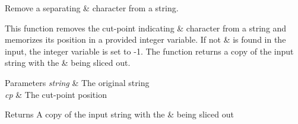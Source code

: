 Remove a separating \textquotesingle{}\&\textquotesingle{} character from a string. 

This function removes the cut-\/point indicating \textquotesingle{}\&\textquotesingle{} character from a string and memorizes its position in a provided integer variable. If not \textquotesingle{}\&\textquotesingle{} is found in the input, the integer variable is set to -\/1. The function returns a copy of the input string with the \textquotesingle{}\&\textquotesingle{} being sliced out.


\begin{DoxyParams}{Parameters}
{\em string} & The original string \\
\hline
{\em cp} & The cut-\/point position \\
\hline
\end{DoxyParams}
\begin{DoxyReturn}{Returns}
A copy of the input string with the \textquotesingle{}\&\textquotesingle{} being sliced out 
\end{DoxyReturn}
